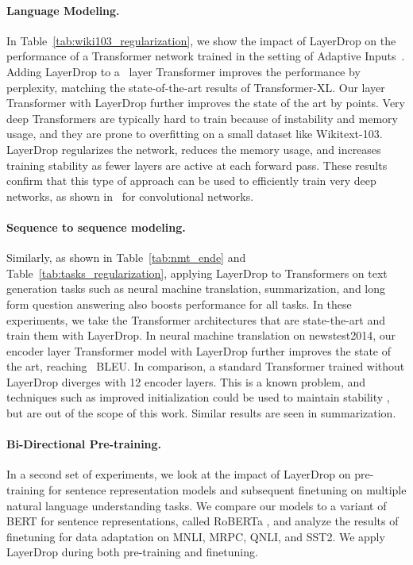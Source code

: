 \paragraph{Language Modeling.} In Table~\ref{tab:wiki103_regularization}, we show the impact of LayerDrop on the performance of a Transformer network trained in the setting of Adaptive Inputs~\citep{baevski2018adaptive}.
Adding LayerDrop to a~ layer Transformer improves the performance by  perplexity, matching the state-of-the-art results of Transformer-XL.
Our  layer Transformer with LayerDrop further improves the state of the art by  points.
Very deep Transformers are typically hard to train because of instability and memory usage, and they are prone to overfitting on a small dataset like Wikitext-103.
LayerDrop regularizes the network, reduces the memory usage, and increases training stability as fewer layers are active at each forward pass.
These results confirm that this type of approach can be used to efficiently train very deep networks, as shown in~\citet{huang2016deep} for convolutional networks.

\paragraph{Sequence to sequence modeling.} Similarly, as shown in Table~\ref{tab:nmt_ende} and Table~\ref{tab:tasks_regularization}, applying LayerDrop to Transformers on text generation tasks such as neural machine translation, summarization, and long form question answering also boosts performance for all tasks.
In these experiments, we take the Transformer architectures that are state-the-art and train them with LayerDrop.
In neural machine translation on newstest2014, our~ encoder layer Transformer model with LayerDrop further improves the state of the art, reaching~ BLEU. In comparison, a standard Transformer trained without LayerDrop diverges with 12 encoder layers. This is a known problem, and techniques such as improved initialization could be used to maintain stability \citep{junczys2019microsoft,zhang2019fixup}, but are out of the scope of this work. Similar results are seen in summarization.

\paragraph{Bi-Directional Pre-training.}
In a second set of experiments, we look at the impact of LayerDrop on pre-training for sentence representation models and subsequent finetuning on multiple natural language understanding tasks. We compare our models to a variant of BERT for sentence representations, called RoBERTa \citep{liu2019roberta}, and analyze the results of finetuning for data adaptation on MNLI, MRPC, QNLI, and SST2.
We apply LayerDrop during both pre-training and finetuning.

